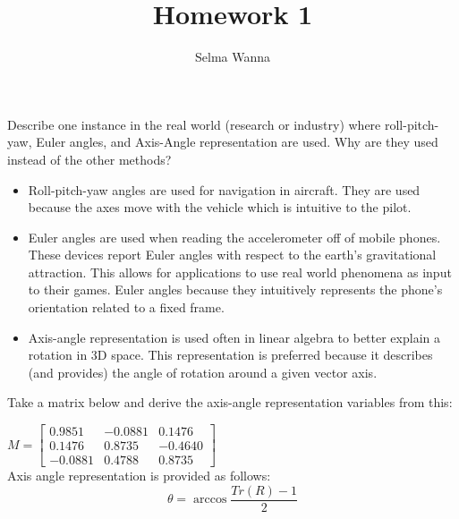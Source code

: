 \documentclass[12pt]{article}
\newenvironment{problem}[2][Problem]{\begin{trivlist}
\item[\hskip \labelsep {\bfseries #1}\hskip \labelsep {\bfseries #2.}]}{\end{trivlist}}
\begin{document}
 
 
\title{Homework 1}
\author{Selma Wanna}
\maketitle
 
\begin{problem}{1}
Describe one instance in the real world (research or industry) where roll-pitch-yaw, Euler angles, and Axis-Angle representation are used. Why are they used instead of the other methods?
\end{problem}
 

\begin{itemize}
  \item Roll-pitch-yaw angles are used for navigation in aircraft.  They are used because the axes move with the vehicle which is intuitive to the pilot.
  \item Euler angles are used when reading the accelerometer off of mobile phones. These devices report Euler angles with respect to the earth's gravitational attraction. This allows for applications to use real world phenomena as input to their games. Euler angles because they intuitively represents the phone's orientation related to a fixed frame.
  \item Axis-angle representation is used often in linear algebra to better explain a rotation in 3D space. This representation is preferred because it describes (and provides) the angle of rotation around a given vector axis. 
\end{itemize}


\begin{problem}{2}
Take a matrix below and derive the axis-angle representation variables from this:
\end{problem}
 
$M = \begin{bmatrix} 0.9851&-0.0881&0.1476\\ 0.1476&0.8735&-0.4640\\ -0.0881&0.4788&0.8735 \end{bmatrix}$  
\\

Axis angle representation is provided as follows: 
\begin{equation}
\theta = \arccos{\frac{Tr(R) - 1}{2}}
\end{equation}
\end{document}
